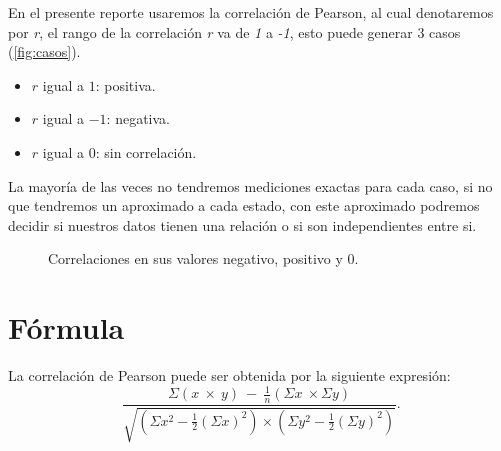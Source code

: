 \documentclass[]{article}
\begin{document}
En el presente reporte usaremos la correlación de Pearson, al cual denotaremos por \textit{r}, el rango de la correlación \textit{r} va de \textit{1} a \textit{-1}, esto puede generar 3 casos (\autoref{fig:casos}).

\begin{itemize}
	\item $r$ igual a $1$: positiva.
	\item $r$ igual a $-1$: negativa.
	\item $r$ igual a $0$:  sin correlación.

\end{itemize}




La mayoría de las veces no tendremos mediciones exactas para cada caso, si no que tendremos un aproximado a cada estado, con este aproximado podremos decidir si nuestros datos tienen una relación o si son independientes entre si.

\begin{figure}[hbt!]
\centering
{}%
\hfill
{}%
\hfill
{}%
\hfill
\caption{Correlaciones en sus valores negativo, positivo y 0.}
\label{fig:casos}
\end{figure}

\section{Fórmula}
La correlación de Pearson puede ser obtenida por la siguiente expresión:
\[\ \frac{\Sigma\left(x\ \times\ y\right)\ -\ \frac{1}{n}\left(\Sigma x\ \times\Sigma y\right)}{\sqrt{\left(\Sigma x^2-\frac{1}{2}\left(\Sigma x\right)^2\right)\times\left(\Sigma y^2-\frac{1}{2}\left(\Sigma y\right)^2\right)}}.\]
\end{document}
